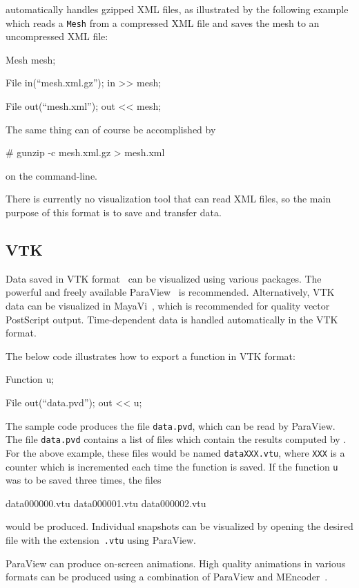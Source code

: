 \dolfin{} automatically handles gzipped XML files, as
illustrated by the following example which reads a \texttt{Mesh} from
a compressed \dolfin{} XML file and saves the mesh to an uncompressed
\dolfin{} XML file:
\begin{code}
  Mesh mesh;

  File in(``mesh.xml.gz'');
  in >> mesh;

  File out(``mesh.xml'');
  out << mesh;
\end{code}
The same thing can of course be accomplished by
\begin{code}
  # gunzip -c mesh.xml.gz > mesh.xml
\end{code}
on the command-line.

There is currently no visualization tool that can read \dolfin{} XML
files, so the main purpose of this format is to save and transfer data.

\subsection{VTK}

Data saved in VTK format~\cite{www:VTK} can be visualized using various
packages. The powerful and freely available ParaView~\cite{www:ParaView} 
is recommended. Alternatively, VTK data can be visualized in 
MayaVi~\cite{www:MayaVi}, which is recommended for quality vector PostScript 
output. Time-dependent data is handled automatically in the VTK format.

The below code illustrates how to export a function in VTK format:
\begin{code}
  Function u;

  File out(``data.pvd'');
  out << u;
\end{code}
The sample code produces the file \texttt{data.pvd}, which can be read 
by ParaView. The file \texttt{data.pvd} contains a list of files which 
contain the results computed by \dolfin{}. For the above example, these 
files would be named \texttt{dataXXX.vtu}, where \texttt{XXX} is a counter 
which is incremented each time the function is saved. If the function 
\texttt{u} was to be saved three times, the files
\begin{code}
  data000000.vtu
  data000001.vtu
  data000002.vtu
\end{code}
would be produced. Individual snapshots can be visualized by opening the 
desired file with the extension~\texttt{.vtu} using ParaView.

ParaView can produce on-screen animations. High quality animations 
in various formats can be produced using a combination of ParaView and 
MEncoder~\cite{www:MEncoder}.

